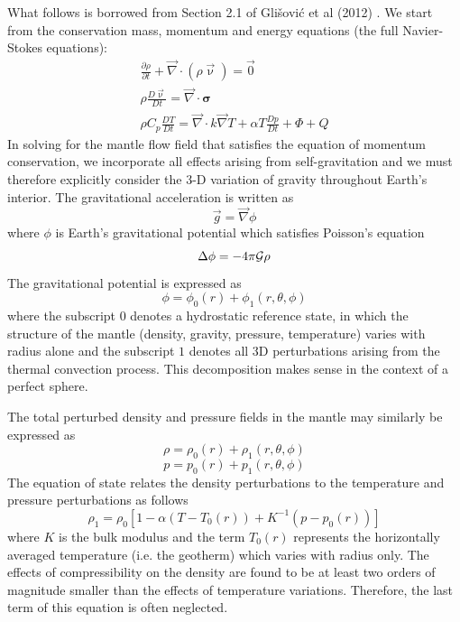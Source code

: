 What follows is borrowed from Section 2.1 of Gli{\v{s}}ovi{\'c} et al (2012) \cite{glfm12}.
We start from the conservation mass, momentum and energy equations (the full Navier-Stokes equations):
\begin{eqnarray}
\frac{\partial \rho}{\partial t} + \vec\nabla \cdot (\rho \vec\upnu) = \vec{0} \\
\rho \frac{D\vec\upnu}{Dt} = \vec\nabla\cdot {\bm \sigma} \\
\rho C_p \frac{D T}{Dt} = \vec\nabla \cdot k \vec\nabla T + \alpha T \frac{Dp}{Dt} + \Phi + Q
\end{eqnarray}
In solving for the mantle flow field that satisfies the equation of momentum conservation, 
we incorporate all effects arising from
self-gravitation and we must therefore explicitly consider the 3-D variation of 
gravity throughout Earth’s interior. The
gravitational acceleration is written as
\[
\vec{g} = \vec\nabla \phi
\]
where $\phi$ is Earth’s gravitational potential which satisfies Poisson's equation
\[
\Delta \phi = - 4 \pi {\cal G} \rho
\]
The gravitational potential is expressed as
\[
\phi = \phi_0(r) + \phi_1(r,\theta,\phi)
\]
where the subscript $0$ denotes a hydrostatic reference state, 
in which the structure of the mantle (density, gravity, pressure, temperature) varies
with radius alone and the subscript $1$ denotes all 3D perturbations arising from the 
thermal convection process. This decomposition makes sense in the context of a perfect sphere.

The total perturbed density and pressure fields in the mantle may similarly be expressed as
\[
\rho = \rho_0(r) + \rho_1(r,\theta,\phi)
\]
\[
p = p_0(r) + p_1(r,\theta,\phi)
\]
The equation of state relates the density perturbations to the temperature and pressure perturbations 
as follows
\[
\rho_1 = \rho_0[1-\alpha(T-T_0(r))+K^{-1} (p-p_0(r))] 
\]
where $K$ is the bulk modulus and the term $T_0(r)$ represents the horizontally averaged temperature (i.e.
the geotherm) which varies with radius only. The effects of compressibility on the density are found to be at least two orders of magnitude
smaller than the effects of temperature variations. Therefore, the last term 
of this equation is often neglected.

